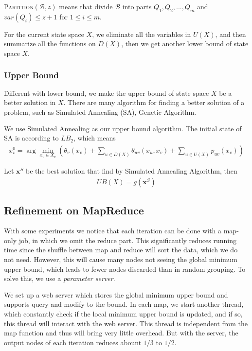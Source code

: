 \textsc{Partition}$(\mathcal{B},z)$ means that divide $\mathcal{B}$ into parts $Q_1,Q_2,...,Q_m$ and $var(Q_i)\le z+1$ for $1\le i\le m$.

For the current state space $X$, we eliminate all the variables in $U(X)$, and then summarize all the functions on $D(X)$, then we get another lower bound of state space $X$.

\subsubsection{Upper Bound}
Different with lower bound, we make the upper bound of state space $X$ be a better solution in $X$. There are many algorithm for finding a better solution of a problem, such as Simulated Annealing (SA), Genetic Algorithm.

We use Simulated Annealing as our upper bound algorithm. The initial state of SA is according to $LB_2$, which means
\begin{align*}
x_v^{0}\!=\!\arg\!\min_{x_v\in X_v}\left(\theta_v(x_v)\!+\!\sum_{u\in D(X)}\theta_{uv}(x_u,x_v)\!+\!\sum_{u\in U(X)}p_{uv}(x_v)\right)
\end{align*}

Let $\mathbf{x}^{S}$ be the best solution that find by Simulated Annealing Algorithm, then
\begin{align*}
  UB(X)=g(\mathbf{x}^{S})
\end{align*}

\subsection{Refinement on MapReduce}
    With some experiments we notice that each iteration can be done with a map-only job, in which we omit the reduce part. This significantly reduces running time since the shuffle between map and reduce will sort the data, which we do not need. However, this will cause many nodes not seeing the global minimum upper bound, which leads to fewer nodes discarded than in random grouping. To solve this, we use a \textit{parameter server}.

    We set up a web server which stores the global minimum upper bound and supports query and modify to the bound. In each map, we start another thread, which constantly check if the local minimum upper bound is updated, and if so, this thread will interact with the web server. This thread is independent from the map function and thus will bring very little overhead. But with the server, the output nodes of each iteration reduces abount $1/3$ to $1/2$.
